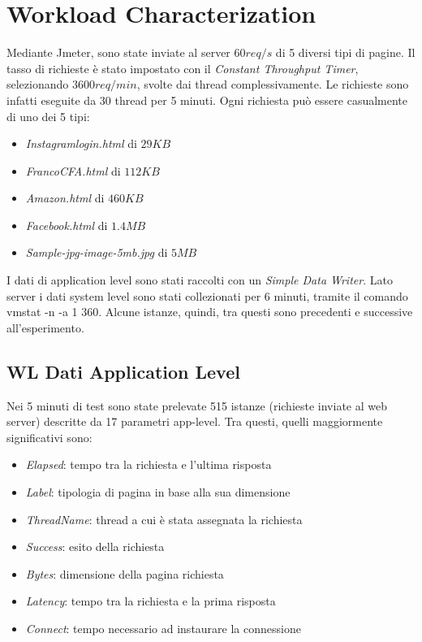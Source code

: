 	\section{Workload Characterization}
		Mediante Jmeter, sono state inviate al server $60req/s$ di 5 diversi tipi di pagine. Il tasso di richieste è stato impostato con il \emph{Constant Throughput Timer}, selezionando $3600req/min$, svolte dai thread complessivamente. Le richieste sono infatti eseguite da 30 thread per 5 minuti. Ogni richiesta può essere casualmente di uno dei 5 tipi:
		\begin{itemize}
			\item \emph{Instagramlogin.html} di $29KB$
			\item \emph{FrancoCFA.html} di $112KB$
			\item \emph{Amazon.html} di $460KB$
			\item \emph{Facebook.html} di $1.4MB$
			\item \emph{Sample-jpg-image-5mb.jpg} di $5MB$
		\end{itemize}
		
		I dati di application level sono stati raccolti con un \emph{Simple Data Writer}. Lato server i dati system level sono stati collezionati per 6 minuti, tramite il comando \textsf{vmstat -n -a 1 360}. Alcune istanze, quindi, tra questi sono precedenti e successive all'esperimento.
		
		\subsection{WL Dati Application Level}
		Nei 5 minuti di test sono state prelevate 515 istanze (richieste inviate al web server) descritte da 17 parametri app-level. Tra questi, quelli maggiormente significativi sono: 
		\begin{itemize}
			\item \textit{Elapsed}: tempo tra la richiesta e l'ultima risposta
			\item \textit{Label}: tipologia di pagina in base alla sua dimensione
			\item \textit{ThreadName}: thread a cui è stata assegnata la richiesta
			\item \textit{Success}: esito della richiesta
			\item \textit{Bytes}: dimensione della pagina richiesta
			\item \textit{Latency}: tempo tra la richiesta e la prima risposta
			\item \textit{Connect}: tempo necessario ad instaurare la connessione
		\end{itemize}
		
